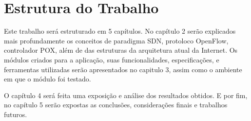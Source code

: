 \section{Estrutura do Trabalho}
Este trabalho será estruturado em 5 capítulos. No capítulo 2 serão explicados mais profundamente os conceitos de paradigma SDN, protoloco OpenFlow, controlador POX, além de das estruturas da arquitetura atual da Internet. Os módulos criados para a aplicação, suas funcionalidades, especificações, e ferramentas utilizadas serão apresentados no capitulo 3, assim como o ambiente em que o módulo foi testado.

O capítulo 4 será feita uma exposição e análise dos resultados obtidos. E por fim, no capítulo 5 serão expostas as conclusões, considerações finais e trabalhos futuros.


